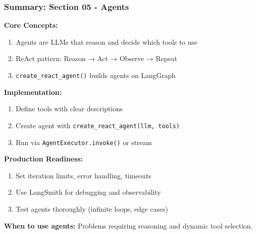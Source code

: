 \documentclass[aspectratio=169,11pt]{beamer}
\begin{document}
\begin{frame}
\frametitle{Summary: Section 05 - Agents}

\textbf{Core Concepts:}
\begin{enumerate}
  \item Agents are LLMs that reason and decide which tools to use
  \item ReAct pattern: Reason → Act → Observe → Repeat
  \item \texttt{create\_react\_agent()} builds agents on LangGraph
\end{enumerate}

\vspace{0.3cm}

\textbf{Implementation:}
\begin{enumerate}
  \item Define tools with clear descriptions
  \item Create agent with \texttt{create\_react\_agent(llm, tools)}
  \item Run via \texttt{AgentExecutor.invoke()} or stream
\end{enumerate}

\vspace{0.3cm}

\textbf{Production Readiness:}
\begin{enumerate}
  \item Set iteration limits, error handling, timeouts
  \item Use LangSmith for debugging and observability
  \item Test agents thoroughly (infinite loops, edge cases)
\end{enumerate}

\vspace{0.3cm}

\textbf{When to use agents:} Problems requiring reasoning and dynamic tool selection.

\end{frame}
\end{document}
